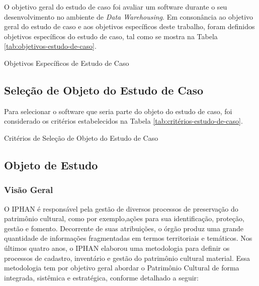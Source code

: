 O objetivo geral do estudo de caso foi avaliar um software durante o seu desenvolvimento no ambiente de \textit{Data Warehousing}. Em consonância ao objetivo geral do estudo de caso e aos objetivos específicos deste trabalho, foram definidos objetivos específicos do estudo de caso, tal como se mostra na Tabela \ref{tab:objetivos-estudo-de-caso}.

\begin{table}[H]
\begin{center}

\caption{Objetivos Específicos de Estudo de Caso}
\label{tab:objetivos-estudo-de-caso}
\end{center}
\end{table}
\FloatBarrier

\subsection{Seleção de Objeto do Estudo de Caso} 

Para selecionar o software que seria parte do objeto do estudo de caso, foi considerado os 
critérios estabelecidos na Tabela \ref{tab:critérios-estudo-de-caso}. 


\begin{table}[H]
\begin{center}

\caption{Critérios de Seleção de Objeto do Estudo de Caso}
\label{tab:critérios-estudo-de-caso}
\end{center}
\end{table}
\FloatBarrier

\subsection{Objeto de Estudo}

\subsubsection{Visão Geral}

O IPHAN é responsável pela gestão de diversos processos de preservação do patrimônio cultural, como por exemplo,ações para sua identificação, proteção, gestão e fomento. Decorrente
de suas atribuições, o órgão produz uma grande quantidade de informações fragmentadas em termos territoriais e temáticos. Nos últimos quatro anos, o IPHAN elaborou uma metodologia
para definir os processos de cadastro, inventário e gestão do patrimônio cultural material. Essa metodologia tem por objetivo geral abordar o Patrimônio Cultural de forma integrada, sistêmica
e estratégica, conforme detalhado a seguir:

